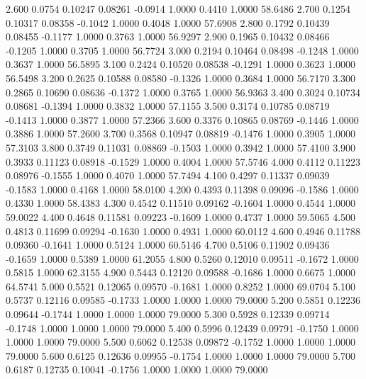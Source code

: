   2.600   0.0754   0.10247   0.08261  -0.0914   1.0000   0.4410   1.0000  58.6486
   2.700   0.1254   0.10317   0.08358  -0.1042   1.0000   0.4048   1.0000  57.6908
   2.800   0.1792   0.10439   0.08455  -0.1177   1.0000   0.3763   1.0000  56.9297
   2.900   0.1965   0.10432   0.08466  -0.1205   1.0000   0.3705   1.0000  56.7724
   3.000   0.2194   0.10464   0.08498  -0.1248   1.0000   0.3637   1.0000  56.5895
   3.100   0.2424   0.10520   0.08538  -0.1291   1.0000   0.3623   1.0000  56.5498
   3.200   0.2625   0.10588   0.08580  -0.1326   1.0000   0.3684   1.0000  56.7170
   3.300   0.2865   0.10690   0.08636  -0.1372   1.0000   0.3765   1.0000  56.9363
   3.400   0.3024   0.10734   0.08681  -0.1394   1.0000   0.3832   1.0000  57.1155
   3.500   0.3174   0.10785   0.08719  -0.1413   1.0000   0.3877   1.0000  57.2366
   3.600   0.3376   0.10865   0.08769  -0.1446   1.0000   0.3886   1.0000  57.2600
   3.700   0.3568   0.10947   0.08819  -0.1476   1.0000   0.3905   1.0000  57.3103
   3.800   0.3749   0.11031   0.08869  -0.1503   1.0000   0.3942   1.0000  57.4100
   3.900   0.3933   0.11123   0.08918  -0.1529   1.0000   0.4004   1.0000  57.5746
   4.000   0.4112   0.11223   0.08976  -0.1555   1.0000   0.4070   1.0000  57.7494
   4.100   0.4297   0.11337   0.09039  -0.1583   1.0000   0.4168   1.0000  58.0100
   4.200   0.4393   0.11398   0.09096  -0.1586   1.0000   0.4330   1.0000  58.4383
   4.300   0.4542   0.11510   0.09162  -0.1604   1.0000   0.4544   1.0000  59.0022
   4.400   0.4648   0.11581   0.09223  -0.1609   1.0000   0.4737   1.0000  59.5065
   4.500   0.4813   0.11699   0.09294  -0.1630   1.0000   0.4931   1.0000  60.0112
   4.600   0.4946   0.11788   0.09360  -0.1641   1.0000   0.5124   1.0000  60.5146
   4.700   0.5106   0.11902   0.09436  -0.1659   1.0000   0.5389   1.0000  61.2055
   4.800   0.5260   0.12010   0.09511  -0.1672   1.0000   0.5815   1.0000  62.3155
   4.900   0.5443   0.12120   0.09588  -0.1686   1.0000   0.6675   1.0000  64.5741
   5.000   0.5521   0.12065   0.09570  -0.1681   1.0000   0.8252   1.0000  69.0704
   5.100   0.5737   0.12116   0.09585  -0.1733   1.0000   1.0000   1.0000  79.0000
   5.200   0.5851   0.12236   0.09644  -0.1744   1.0000   1.0000   1.0000  79.0000
   5.300   0.5928   0.12339   0.09714  -0.1748   1.0000   1.0000   1.0000  79.0000
   5.400   0.5996   0.12439   0.09791  -0.1750   1.0000   1.0000   1.0000  79.0000
   5.500   0.6062   0.12538   0.09872  -0.1752   1.0000   1.0000   1.0000  79.0000
   5.600   0.6125   0.12636   0.09955  -0.1754   1.0000   1.0000   1.0000  79.0000
   5.700   0.6187   0.12735   0.10041  -0.1756   1.0000   1.0000   1.0000  79.0000

